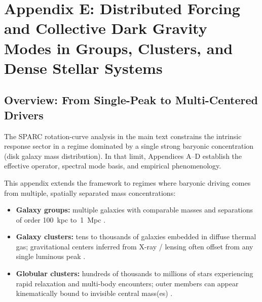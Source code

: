
\section{Appendix E: Distributed Forcing and Collective Dark Gravity Modes in  
Groups, Clusters, and Dense Stellar Systems}\label{appendix-e-distributed-forcing}

\subsection{Overview: From Single-Peak to Multi-Centered Drivers}\label{e.1-overview}

The SPARC rotation-curve analysis in the main text constrains the intrinsic response 
sector in a regime dominated by a single strong baryonic concentration (disk galaxy mass 
distribution). In that limit, Appendices A--D establish the effective operator, spectral 
mode basis, and empirical phenomenology.

This appendix extends the framework to regimes where baryonic driving comes from 
multiple, spatially separated mass concentrations:
\begin{itemize}
  \item \textbf{Galaxy groups:} multiple galaxies with comparable masses and separations 
    of order 100~kpc to~1~Mpc \citep{BullockBoylanKolchin2017SmallScale}.
  \item \textbf{Galaxy clusters:} tens to thousands of galaxies embedded in diffuse 
    thermal gas; gravitational centers inferred from X-ray / lensing often offset from 
    any single luminous peak \citep{Clowe2006Bullet, MAST2019HFF}.
  \item \textbf{Globular clusters:} hundreds of thousands to millions of stars 
    experiencing rapid relaxation and multi-body encounters; outer members can appear 
    kinematically bound to invisible central mass(es) \citep{BullockBoylanKolchin2017SmallScale}.
\end{itemize}


